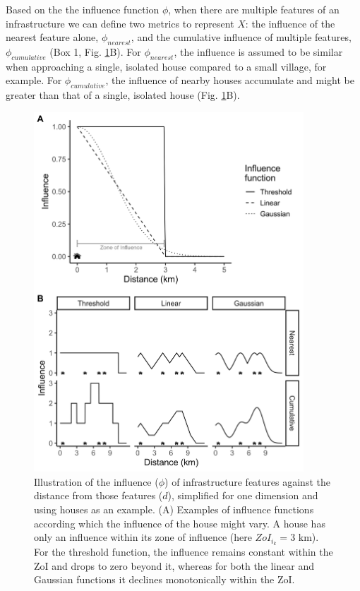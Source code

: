 \documentclass[titlepage]{article}
\begin{document}
Based on the the influence function $\phi$, when there are multiple features of an infrastructure we can define two metrics to represent $X$: the influence of the nearest feature alone, $\phi_{nearest}$, and the cumulative influence of multiple features, $\phi_{cumulative}$ (Box 1, Fig. \ref{fig:zoi_conceptual}B). For $\phi_{nearest}$, the influence is assumed to be similar when approaching a single, isolated house compared to a small village, for example. For $\phi_{cumulative}$, the influence of nearby houses accumulate and might be greater than that of a single, isolated house (Fig. \ref{fig:zoi_conceptual}B).

\begin{figure}[!htbp]
\centering
\includegraphics[width=0.9\textwidth]{figures/ZoI_conceptual.png}
\caption{\label{fig:zoi_conceptual} Illustration of the influence ($\phi$) of infrastructure features against the distance from those features ($d$), simplified for one dimension and using houses as an example. (A) Examples of influence functions according which the influence of the house might vary. A house has only an influence within its zone of influence (here $ZoI_{i_k} = 3 \text{ km}$). For the threshold function, the influence remains constant within the ZoI and drops to zero beyond it, whereas for both the linear and Gaussian functions it declines monotonically within the ZoI. 
}
\end{figure}
\end{document}
